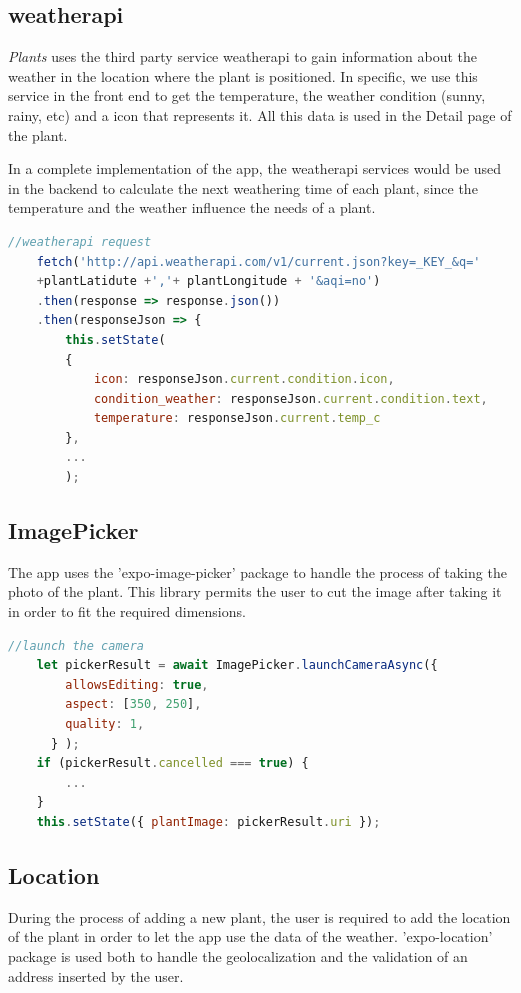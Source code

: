 \documentclass[10pt]{article}
\begin{document}
	\subsection{weatherapi}
	
	\textit{Plants} uses the third party service weatherapi to gain information about the weather in the location where the plant is positioned. In specific, we use this service in the front end to get the temperature, the weather condition (sunny, rainy, etc) and a icon that represents it. All this data is used in the Detail page of the plant. 
	
	In a complete implementation of the app, the weatherapi services would be used in the backend to calculate the next weathering time of each plant, since the temperature and the weather influence the needs of a plant.
	
	\begin{lstlisting}[language=JavaScript]
    //weatherapi request
    fetch('http://api.weatherapi.com/v1/current.json?key=_KEY_&q='
    +plantLatidute +','+ plantLongitude + '&aqi=no')
    .then(response => response.json())
    .then(responseJson => {
        this.setState(
        {
            icon: responseJson.current.condition.icon,
            condition_weather: responseJson.current.condition.text,
            temperature: responseJson.current.temp_c
        },
        ...
        );
	\end{lstlisting}
	
	\subsection{ImagePicker}
	The app uses the 'expo-image-picker' package to handle the process of taking the photo of the plant. This library permits the user to cut the image after taking it in order to fit the required dimensions.
	
	\begin{lstlisting}[language=JavaScript]
    //launch the camera
    let pickerResult = await ImagePicker.launchCameraAsync({
        allowsEditing: true,
        aspect: [350, 250],
        quality: 1,
      } );
    if (pickerResult.cancelled === true) {
        ...
    }
    this.setState({ plantImage: pickerResult.uri });
	\end{lstlisting}
	
	\subsection{Location}
	During the process of adding a new plant, the user is required to add the location of the plant in order to let the app use the data of the weather. 'expo-location' package is used both to handle the geolocalization and the validation of an address inserted by the user.
	
\end{document}
